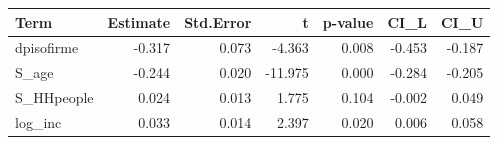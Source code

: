 \begin{tabular}{lrrrrrr}
  \hline
Term & Estimate & Std.Error & t & p-value & CI\_L & CI\_U \\ 
  \hline
dpisofirme & -0.317 & 0.073 & -4.363 & 0.008 & -0.453 & -0.187 \\ 
  S\_age & -0.244 & 0.020 & -11.975 & 0.000 & -0.284 & -0.205 \\ 
  S\_HHpeople & 0.024 & 0.013 & 1.775 & 0.104 & -0.002 & 0.049 \\ 
  log\_inc & 0.033 & 0.014 & 2.397 & 0.020 & 0.006 & 0.058 \\ 
   \hline
\end{tabular}
